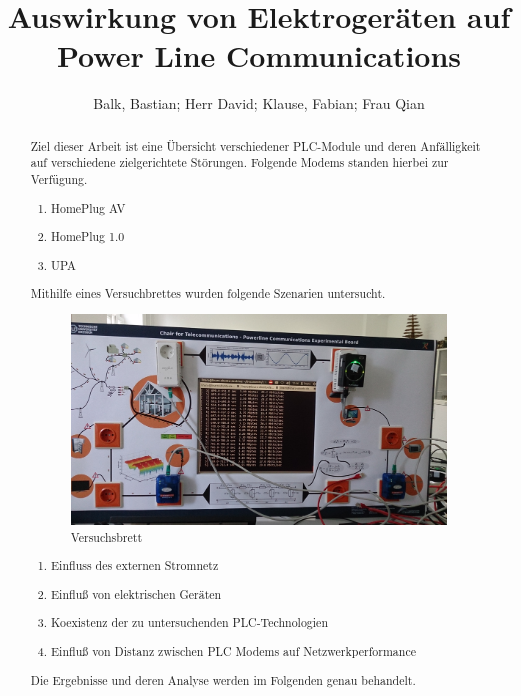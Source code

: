 \documentclass[a4paper]{scrreprt}
\begin{document}
\author{Balk, Bastian; Herr David; Klause, Fabian; Frau Qian}
\title{Auswirkung von Elektrogeräten auf Power Line Communications} 
\maketitle

\nocite{Zitat01}
\nocite{Zitat02}
\nocite{PLC}






\begin{abstract}
\noindent Ziel dieser Arbeit ist eine Übersicht verschiedener PLC-Module und deren Anfälligkeit auf verschiedene zielgerichtete Störungen.
Folgende Modems standen hierbei zur Verfügung.

\begin{enumerate}
\item HomePlug AV
\item HomePlug 1.0
\item UPA
\end{enumerate}
Mithilfe eines Versuchbrettes wurden folgende Szenarien untersucht.

\begin{figure}[!htp]
\centering
\includegraphics[scale=0.1]{./PLC.JPG}
\caption{Versuchsbrett}
\label{fig:PLC}
\end{figure}

\begin{enumerate}
\item Einfluss des externen Stromnetz 
\item Einfluß von elektrischen Geräten 
\item Koexistenz der zu untersuchenden PLC-Technologien
\item Einfluß von Distanz zwischen PLC Modems auf Netzwerkperformance
\end{enumerate}

Die Ergebnisse und deren Analyse werden im Folgenden genau behandelt.
\end{abstract} 
\end{document}
